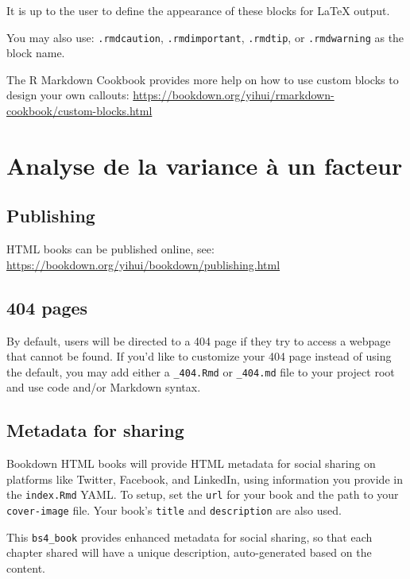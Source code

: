 \documentclass[
]{book}
\theoremstyle{definition}
\theoremstyle{definition}
\theoremstyle{definition}
\theoremstyle{definition}
\theoremstyle{remark}
\begin{document}
It is up to the user to define the appearance of these blocks for LaTeX output.

You may also use: \texttt{.rmdcaution}, \texttt{.rmdimportant}, \texttt{.rmdtip}, or \texttt{.rmdwarning} as the block name.

The R Markdown Cookbook provides more help on how to use custom blocks to design your own callouts: \url{https://bookdown.org/yihui/rmarkdown-cookbook/custom-blocks.html}

\hypertarget{anova1}{%
\chapter{Analyse de la variance à un facteur}\label{anova1}}

\hypertarget{publishing}{%
\section{Publishing}\label{publishing}}

HTML books can be published online, see: \url{https://bookdown.org/yihui/bookdown/publishing.html}

\hypertarget{pages}{%
\section{404 pages}\label{pages}}

By default, users will be directed to a 404 page if they try to access a webpage that cannot be found. If you'd like to customize your 404 page instead of using the default, you may add either a \texttt{\_404.Rmd} or \texttt{\_404.md} file to your project root and use code and/or Markdown syntax.

\hypertarget{metadata-for-sharing}{%
\section{Metadata for sharing}\label{metadata-for-sharing}}

Bookdown HTML books will provide HTML metadata for social sharing on platforms like Twitter, Facebook, and LinkedIn, using information you provide in the \texttt{index.Rmd} YAML. To setup, set the \texttt{url} for your book and the path to your \texttt{cover-image} file. Your book's \texttt{title} and \texttt{description} are also used.

This \texttt{bs4\_book} provides enhanced metadata for social sharing, so that each chapter shared will have a unique description, auto-generated based on the content.
\end{document}
